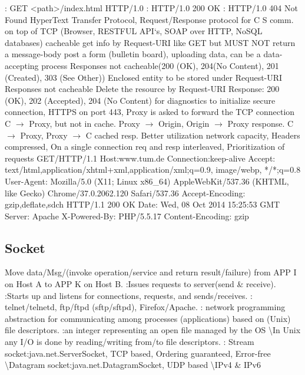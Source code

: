 : GET <path>/index.html HTTP/1.0
: HTTP/1.0 200 OK
: HTTP/1.0 404 Not Found 
\textbar \textbar
{}
HyperText Transfer Protocol,
Request/Response protocol for C S comm. on top of TCP
(Browser,
RESTFUL API‘s,
SOAP over HTTP,
NoSQL databases)
cacheable get info by Request-URI
 like GET but MUST NOT return a message-body
 post a form (bulletin board), uploading data,
can be a data-accepting process
Responses not cacheable(200 (OK), 204(No Content), 201
(Created), 303 (See Other)) 
 Enclosed entity to be stored under Request-URI
Responses not cacheable
 Delete the resource by Request-URI
Response: 200 (OK), 202 (Accepted), 204 (No Content)
 for diagnostics
 to initialize secure connection, HTTPS on port 443,
Proxy is asked to forward the TCP connection
\textbar
{}C  $\rightarrow$ Proxy, but not in cache. 
Proxy  $\rightarrow$ Origin, Origin $\rightarrow$ Proxy response.
C  $\rightarrow$ Proxy, Proxy $\rightarrow$ C cached resp.
\textbar
{}
Better utilization network capacity,
Headers compressed,
On a single connection req and resp interleaved,
Prioritization of requests
GET/HTTP/1.1
Host:www.tum.de
Connection:keep-alive
Accept: text/html,application/xhtml+xml,application/xml;q=0.9, image/webp, */*;q=0.8
User-Agent: Mozilla/5.0 (X11; Linux x86\_64) AppleWebKit/537.36 (KHTML, like Gecko) Chrome/37.0.2062.120 Safari/537.36
Accept-Encoding: gzip,deflate,sdch
\textbar \textbar \textbar
HTTP/1.1 200 OK
Date: Wed, 08 Oct 2014 15:25:53 GMT
Server: Apache
X-Powered-By: PHP/5.5.17
Content-Encoding: gzip
%
%
%
\subsection*{Socket}
Move data/Msg/(invoke operation/service and return result/failure) 
from APP I on Host A to APP K on Host B.
:Issues requests to server(send \& receive).
:Starts up and listens for connections, requests, and sends/receives.
: telnet/telnetd, ftp/ftpd (sftp/sftpd), Firefox/Apache.
: network programming abstraction for communicating among processes (applications) based on (Unix) file
descriptors.
:an integer representing an open file managed by the OS \textbackslash In Unix any I/O is done by reading/writing from/to file
descriptors.
: 
Stream socket:java.net.ServerSocket, TCP based, Ordering guaranteed, Error-free 
\textbackslash Datagram socket:java.net.DatagramSocket, UDP based 
\textbackslash IPv4 \& IPv6

